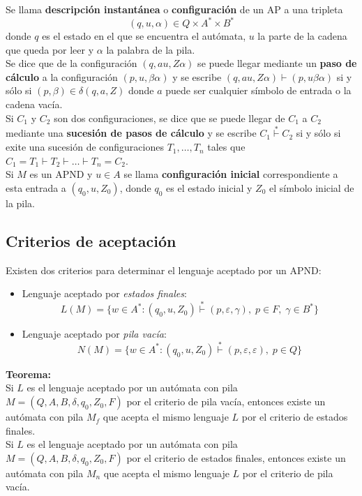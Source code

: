 \documentclass[11pt,titlepage,a4paper]{article}
\theoremstyle{ejemplo}
\theoremstyle{algoritmo}
\begin{document}
Se llama \textbf{descripción instantánea} o \textbf{configuración} de un AP a una
tripleta
$$(q,u,\alpha)\in Q\times A^*\times B^*$$
donde $q$ es el estado en el que se encuentra el autómata, $u$ la parte de la
cadena que queda por leer y $\alpha$ la palabra de la pila.
\\

Se dice que de la configuración $(q,au,Z\alpha)$ se puede llegar mediante un 
\textbf{paso de cálculo} a la configuración $(p,u,\beta\alpha)$ y se escribe 
$(q,au,Z\alpha)\vdash(p,u\beta\alpha)$ si y sólo si $(p,\beta)\in\delta(q,a,Z)$
donde $a$ puede ser cualquier símbolo de entrada o la cadena vacía.
\\

Si $C_1$ y $C_2$ son dos configuraciones, se dice que se puede llegar de $C_1$ a 
$C_2$ mediante una \textbf{sucesión de pasos de cálculo} y se escribe 
$C_1\overset{*}{\vdash}C_2$ si y sólo si exite una sucesión de configuraciones 
$T_1,\dots,T_n$ tales que $C_1=T_1\vdash T_2\vdash\dots\vdash T_n=C_2$.
\\

Si $M$ es un APND y $u\in A$ se llama \textbf{configuración inicial} 
correspondiente a esta entrada a $(q_0,u,Z_0)$, donde $q_0$ es el estado inicial 
y $Z_0$ el símbolo inicial de la pila.

\subsection{Criterios de aceptación}

Existen dos criterios para determinar el lenguaje aceptado por un APND:
\begin{itemize}[noitemsep]
	\item Lenguaje aceptado por \emph{estados finales}:
	$$L(M)=\{w\in A^*:(q_0,u,Z_0)\overset{*}{\vdash}(p,\varepsilon,\gamma),\;
	p\in F,\;\gamma\in B^*\}$$
	\item Lenguaje aceptado por \emph{pila vacía}:
	$$N(M)=\{w\in A^*:(q_0,u,Z_0)\overset{*}{\vdash}(p,\varepsilon,\varepsilon),
	\;p\in Q\}$$
\end{itemize}
\textbf{Teorema:}\\
Si $L$ es el lenguaje aceptado por un autómata con pila $M=(Q,A,B,\delta,q_0,
Z_0,F)$ por el criterio de pila vacía, entonces existe un autómata con pila $M_f$
que acepta el mismo lenguaje $L$ por el criterio de estados finales.\\
Si $L$ es el lenguaje aceptado por un autómata con pila $M=(Q,A,B,\delta,q_0,
Z_0,F)$ por el criterio de estados finales, entonces existe un autómata con pila 
$M_n$ que acepta el mismo lenguaje $L$ por el criterio de pila vacía.
\end{document}
